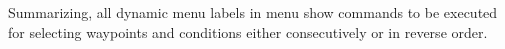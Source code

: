 Summarizing, all dynamic menu labels in menu  show commands to be
executed for selecting waypoints and conditions either consecutively or in reverse
order.










